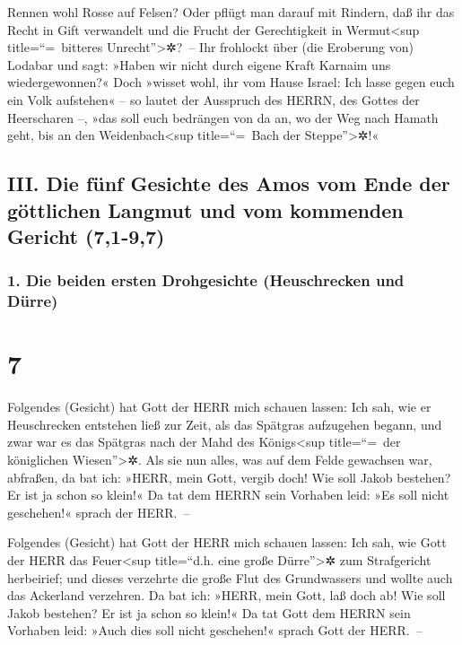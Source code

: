 Rennen wohl Rosse auf Felsen? Oder pflügt man darauf mit
Rindern, daß ihr das Recht in Gift verwandelt und die Frucht der
Gerechtigkeit in Wermut\textless sup title=``=~bitteres
Unrecht''\textgreater✲?~-- Ihr frohlockt über (die
Eroberung von) Lodabar und sagt: »Haben wir nicht durch eigene Kraft
Karnaim uns wiedergewonnen?« Doch »wisset wohl, ihr vom
Hause Israel: Ich lasse gegen euch ein Volk aufstehen« -- so lautet der
Ausspruch des HERRN, des Gottes der Heerscharen --, »das soll euch
bedrängen von da an, wo der Weg nach Hamath geht, bis an den
Weidenbach\textless sup title=``=~Bach der Steppe''\textgreater✲!«

\hypertarget{iii.-die-fuxfcnf-gesichte-des-amos-vom-ende-der-guxf6ttlichen-langmut-und-vom-kommenden-gericht-71-97}{%
\subsection{III. Die fünf Gesichte des Amos vom Ende der göttlichen
Langmut und vom kommenden Gericht
(7,1-9,7)}\label{iii.-die-fuxfcnf-gesichte-des-amos-vom-ende-der-guxf6ttlichen-langmut-und-vom-kommenden-gericht-71-97}}

\hypertarget{die-beiden-ersten-drohgesichte-heuschrecken-und-duxfcrre}{%
\subsubsection{1. Die beiden ersten Drohgesichte (Heuschrecken und
Dürre)}\label{die-beiden-ersten-drohgesichte-heuschrecken-und-duxfcrre}}

\hypertarget{section-6}{%
\section{7}\label{section-6}}

Folgendes (Gesicht) hat Gott der HERR mich schauen lassen:
Ich sah, wie er Heuschrecken entstehen ließ zur Zeit, als das Spätgras
aufzugehen begann, und zwar war es das Spätgras nach der Mahd des
Königs\textless sup title=``=~der königlichen Wiesen''\textgreater✲.
Als sie nun alles, was auf dem Felde gewachsen war,
abfraßen, da bat ich: »HERR, mein Gott, vergib doch! Wie soll Jakob
bestehen? Er ist ja schon so klein!« Da tat dem HERRN sein
Vorhaben leid: »Es soll nicht geschehen!« sprach der HERR.~--

Folgendes (Gesicht) hat Gott der HERR mich schauen lassen:
Ich sah, wie Gott der HERR das Feuer\textless sup title=``d.h. eine
große Dürre''\textgreater✲ zum Strafgericht herbeirief; und dieses
verzehrte die große Flut des Grundwassers und wollte auch das Ackerland
verzehren. Da bat ich: »HERR, mein Gott, laß doch ab! Wie
soll Jakob bestehen? Er ist ja schon so klein!« Da tat
Gott dem HERRN sein Vorhaben leid: »Auch dies soll nicht geschehen!«
sprach Gott der HERR.~--

